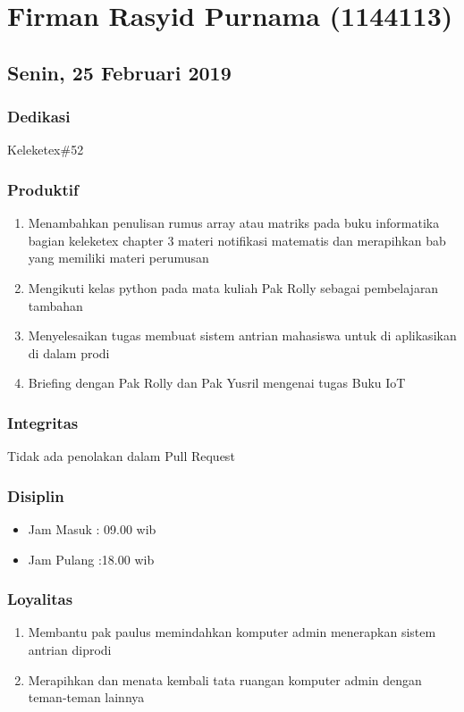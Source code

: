 \chapter{Firman Rasyid Purnama (1144113)}

\section{Senin, 25 Februari 2019}
\subsection{Dedikasi}
Keleketex\#52
\subsection{Produktif}
\begin{enumerate}
\item Menambahkan penulisan rumus array atau matriks pada buku informatika bagian keleketex chapter 3 materi notifikasi matematis dan merapihkan bab yang memiliki materi perumusan
\item Mengikuti kelas python pada mata kuliah Pak Rolly sebagai pembelajaran tambahan
\item Menyelesaikan tugas membuat sistem antrian mahasiswa untuk di aplikasikan di dalam prodi
\item Briefing dengan Pak Rolly dan Pak Yusril mengenai tugas Buku IoT
\end{enumerate}
\subsection{Integritas}
Tidak ada penolakan dalam Pull Request
\subsection{Disiplin}
\begin{itemize}
\item Jam Masuk : 09.00 wib
\item Jam Pulang :18.00 wib
\end{itemize}
\subsection{Loyalitas}
\begin{enumerate}
\item Membantu pak paulus memindahkan komputer admin menerapkan sistem antrian diprodi
\item Merapihkan dan menata kembali tata ruangan komputer admin dengan teman-teman lainnya
\end{enumerate}

